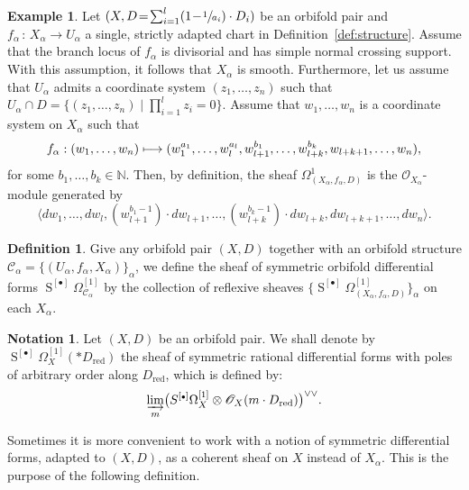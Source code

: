 \documentclass[10pt]{amsart}
\let\mathcal\mathscr
\let\scr\mathscr
\let\oldbullet\bullet
\newcommand{\sbullet}{{\scriptscriptstyle\oldbullet}}
\let\bullet\sbullet
\def\mto{\mathchoice{\longmapsto}{\mapsto}{\mapsto}{\mapsto}}
\theoremstyle{plain}
\theoremstyle{definition}
\newtheorem{definition}[theorem]{Definition}
\newtheorem{example}[theorem]{Example}
\newtheorem{notation}[theorem]{Notation}
\numberwithin{equation}{theorem}
\DeclareMathOperator{\red}{red}
\DeclareMathOperator{\Sym}{S}
\newcommand{\sO}{\scr{O}}
\begin{document}
\begin{example}\label{ex:OrbiCot}
Let $(X, D\!=\!\sum_{i=1}^l (1\!-\!\sfrac{1}{a_i})\cdot D_i)$ be an orbifold pair and \hbox{$f_{\alpha}\,{:}\,X_{\alpha}\!\to\!U_{\alpha}$}
a single, strictly adapted chart in Definition~\ref{def:structure}.
Assume that the branch locus of $f_{\alpha}$ is divisorial and has simple normal crossing support.
With this assumption, it follows that $X_{\alpha}$ is smooth.
Furthermore, let us assume that $U_{\alpha}$ admits a coordinate system $(z_1, \ldots, z_n)$
such that $U_{\alpha}\cap D = \{ (z_1, \ldots, z_n) \mid \prod_{i=1}^l z_i =0 \}$.
Assume that $w_1, \ldots , w_n$ is a coordinate system on $X_{\alpha}$ such that
\begin{equation} \label{expradaptedcover}
f_{\alpha}: (w_1, \ldots, w_n) \mto (w_1^{a_1} , \ldots, w_l^{a_l}, w_{l+1}^{b_1}, \ldots, w_{l+k}^{b_k},
w_{l+k+1}, \ldots, w_n),
\end{equation}
for some $b_1, \ldots, b_k \in \mathbb N$.
Then, by definition, the sheaf $\Omega^1_{(X_{\alpha}, f_{\alpha}, D )}$
is the $\sO_{X_{\alpha}}$-module generated by
$$
\bigl\langle dw_1 , \ldots, dw_l, (w^{b_1-1}_{l+1})\cdot dw_{l+1}, \ldots, (w^{b_k-1}_{l+k})\cdot dw_{l+k},
dw_{l+k+1}, \ldots, dw_n \bigr\rangle.
$$
\end{example}

\begin{definition}
Give any orbifold pair $(X,D)$ together with an orbifold structure
$\mathcal C_{\alpha} = \{ (U_{\alpha}, f_{\alpha}, X_{\alpha}) \}_{\alpha}$,
we define the sheaf of symmetric orbifold differential forms $\Sym^{[\bullet]} \Omega^{[1]}_{\mathcal C_{\alpha}}$
by the collection of reflexive sheaves $\{ \Sym^{[\bullet]} \Omega^{[1]}_{(X_{\alpha}, f_{\alpha}, D)} \}_{\alpha}$
on each $X_{\alpha}$.
\end{definition}

\begin{notation}
Let $(X,D)$ be an orbifold pair. We shall denote by $\Sym^{[\bullet]}\Omega^{[1]}_X(* D_{\red})$
the sheaf of symmetric rational differential forms with poles of arbitrary order along $D_{\red}$,
which is defined by:
$$
\varinjlim_{m} \bigl(S^{[\bullet]} \Omega_X^{[1]} \otimes \sO_X(m\cdot D_{\red}) \bigr)^{\vee\vee}.
$$
\end{notation}

Sometimes it is more convenient to work with a notion of symmetric differential forms,
adapted to $(X,D)$, as a coherent sheaf on $X$ instead of $X_{\alpha}$.
This is the purpose of the following definition.
\end{document}
